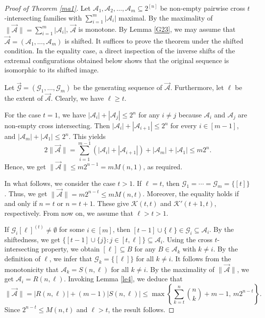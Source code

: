 \documentclass[11pt,a4paper]{article}
\begin{document}
\begin{proof}[Proof of Theorem \ref{ma1}]
Let $ \mathcal{A}_1, \mathcal{A}_2, \ldots, \mathcal{A}_m \subseteq 2^{[n]}$ be non-empty pairwise cross $t$-intersecting families with 
$\sum_{i=1}^{m} |\mathcal{A}_i|$ maximal. 
 By the maximality of 
$\|\vec{\mathcal{A}}\| = \sum_{i=1}^{m} |\mathcal{A}_i|$,   $\vec{\mathcal{A}}$ is monotone.
By Lemma \ref{G23}, we may assume that $\vec{\mathcal{A}} = (\mathcal{A}_1, \ldots, \mathcal{A}_m)$ is shifted. It suffices to prove the theorem under the shifted condition.  In the equality case, a direct inspection of
the inverse shifts of the extremal configurations obtained below shows that
the original sequence is isomorphic to its shifted image.

Let $\vec{\mathcal{G}} = (\mathcal{G}_1, \ldots, \mathcal{G}_m)$ be the generating sequence of $\vec{\mathcal{A}}$.
Furthermore, let $\ell$ be the extent of $\vec{\mathcal{A}}$.
Clearly, we have $\ell\geq  t$. 

For the case $t=1$, we have  $|\mathcal{A}_i|+|\mathcal{A}_{j}|\leq 2^{n}$ for any $i\neq j$ because $\mathcal{A}_i$ and $\mathcal{A}_j$ are non-empty cross intersecting. Then $|\mathcal{A}_i|+|\mathcal{A}_{i+1}|\leq 2^{n}$ for every $i\in [m-1]$, and $|\mathcal{A}_m|+|\mathcal{A}_{1}|\leq 2^{n}$. This yields 
$$2\|\vec{\mathcal{A}}\|=\sum_{i=1}^{m-1}(|\mathcal{A}_i|+|\mathcal{A}_{i+1}|)+|\mathcal{A}_m|+|\mathcal{A}_{1}|\leq m2^{n}. $$
Hence, we get  
$\|\vec{\mathcal{A}}\|\leq m2^{n-1}= m M(n, 1)$, 
as required. 

In what follows, we consider the case $t>1$. 
If $\ell=t$, then $\mathcal{G}_1=\cdots=\mathcal{G}_m=\{[t]\}$.
Thus, we get $\|\vec{\mathcal{A}}\|=m2^{n-t}\leq m M(n, t)$. Moreover, the equality holds if and only if $n=t$ or
$n=t+1$. These give $\mathcal{K}(t,t)$ and $\mathcal{K}'(t+1,t)$, respectively. 
From now on, we assume that $\ell>t>1$.


If $\mathcal{G}_i[\ell]^{(t)}\neq \emptyset$ for some $i\in [m]$, then $[t-1]\cup\{\ell\}\in \mathcal{G}_i\subseteq \mathcal{A}_i$. By the shiftedness, we get 
$
\{[t-1]\cup \{j\}: j\in [t,\ell]\}\subseteq \mathcal{A}_i.
$
Using the cross $t$-intersecting property, we obtain $[\ell] \subseteq B$ for 
any $B\in \mathcal{A}_k$ with $k\neq i$.
By the definition of $\ell$, we infer that $\mathcal{G}_k=\{[\ell]\}$ for all $k\neq i$. It follows from the monotonicity that $\mathcal{A}_k=S(n,\ell)$ for all $k\neq i$. By the maximality of 
$\|\vec{\mathcal{A}}\|$, we get $\mathcal{A}_i=R(n,\ell)$.  
Invoking Lemma \ref{le4}, we deduce that
$$\|\vec{\mathcal{A}}\|=|R(n,\ell)|+(m-1)|S(n,\ell)|\leq  \max \left\{ \sum_{k=t} ^{n}\binom{n}{k}  + m - 1, \, m 2^{n-t} \right\}.$$
Since
$
2^{n-t}\le M(n,t)
$ 
and 
$\ell>t$, the result follows.





\end{proof}
\end{document}
